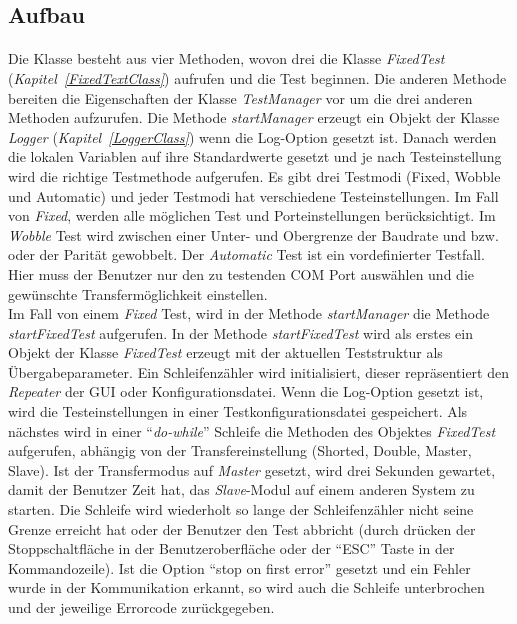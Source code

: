\subsection{Aufbau}
\paragraph{}
Die Klasse besteht aus vier Methoden, wovon drei die Klasse \textit{FixedTest} (\textit{Kapitel~\ref{FixedTextClass}}) aufrufen und die Test beginnen. Die anderen Methode bereiten die Eigenschaften der Klasse \textit{TestManager} vor um die drei anderen Methoden aufzurufen. Die Methode \textit{startManager} erzeugt ein Objekt der Klasse \textit{Logger} (\textit{Kapitel~\ref{LoggerClass}}) wenn die Log-Option gesetzt ist. Danach werden die lokalen Variablen auf ihre Standardwerte gesetzt und je nach Testeinstellung wird die richtige Testmethode aufgerufen. Es gibt drei Testmodi (Fixed, Wobble und Automatic) und jeder Testmodi hat verschiedene Testeinstellungen. Im Fall von \textit{Fixed}, werden alle möglichen Test und Porteinstellungen berücksichtigt. Im \textit{Wobble} Test wird zwischen einer Unter- und Obergrenze der Baudrate und bzw. oder der Parität gewobbelt. Der \textit{Automatic} Test ist ein vordefinierter Testfall. Hier muss der Benutzer nur den zu testenden COM Port auswählen und die gewünschte Transfermöglichkeit einstellen.\\


Im Fall von einem \textit{Fixed} Test, wird in der Methode \textit{startManager} die Methode \textit{startFixedTest} aufgerufen. In der Methode \textit{startFixedTest} wird als erstes ein Objekt der Klasse \textit{FixedTest} erzeugt mit der aktuellen Teststruktur als Übergabeparameter. Ein Schleifenzähler wird initialisiert, dieser repräsentiert den \textit{Repeater} der GUI oder Konfigurationsdatei. Wenn die Log-Option gesetzt ist, wird die Testeinstellungen in einer Testkonfigurationsdatei gespeichert. Als nächstes wird in einer "`\textit{do-while}"' Schleife die Methoden des Objektes \textit{FixedTest} aufgerufen, abhängig von der  Transfereinstellung (Shorted, Double, Master, Slave). Ist der Transfermodus auf \textit{Master} gesetzt, wird drei Sekunden gewartet, damit der Benutzer Zeit hat, das \textit{Slave}-Modul auf einem anderen System zu starten. Die Schleife wird wiederholt so lange der Schleifenzähler nicht seine Grenze erreicht hat oder der Benutzer den Test abbricht (durch drücken der Stoppschaltfläche in der Benutzeroberfläche oder der "`ESC"' Taste in der Kommandozeile). Ist die Option "`stop on first error"' gesetzt und ein Fehler wurde in der Kommunikation erkannt, so wird auch die Schleife unterbrochen und der jeweilige Errorcode zurückgegeben.\\


